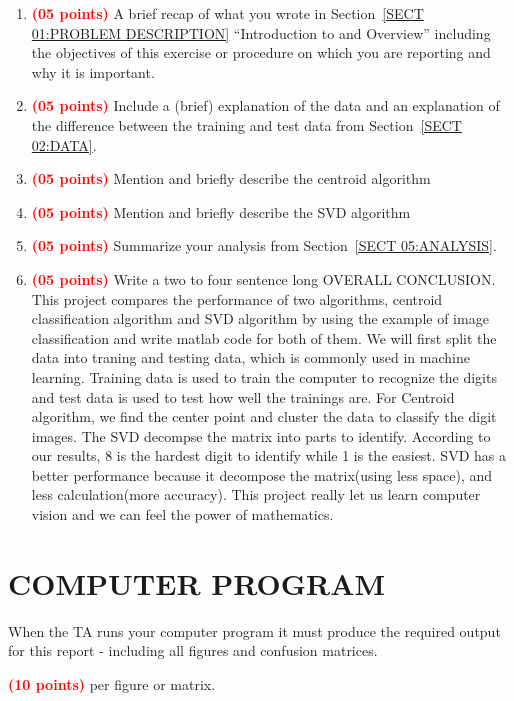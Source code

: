 \documentclass[dvipsnames,12pt]{article} %
\newcommand{\Brd}[1]{{\textbf{\textcolor{Red}{#1}}}}               %
\begin{document}
      \begin{enumerate}

        \item \Brd{(05 points)} A brief recap of what you wrote
          in Section~\ref{SECT 01:PROBLEM DESCRIPTION} ``Introduction to and Overview'' including
          the objectives of this exercise or procedure on which you are reporting and why it is
          important.

        \item \Brd{(05 points)} Include a (brief) explanation of the data  and an explanation of
          the difference between the training and test data from Section~\ref{SECT 02:DATA}.

        \item \Brd{(05 points)} Mention and briefly describe the centroid algorithm

        \item \Brd{(05 points)} Mention and briefly describe the SVD algorithm

        \item \Brd{(05 points)} Summarize your analysis from Section~\ref{SECT 05:ANALYSIS}.

        \item \Brd{(05 points)} Write a two to four sentence long OVERALL CONCLUSION.
This project compares the performance of two algorithms, centroid classification algorithm and SVD algorithm by using the example of image classification and write matlab code for both of them. We will first split the data into traning and testing data, which is commonly used in machine learning. Training data is used to train the computer to recognize the digits and test data is used to test how well the trainings are. For Centroid algorithm, we find the center point and cluster the data to classify the digit images. The SVD decompse the matrix into parts to identify. According to our results, 8 is the hardest digit to identify while 1 is the easiest. SVD has a better performance because it decompose the matrix(using less space), and less calculation(more accuracy). This project really let us learn computer vision and we can feel the power of mathematics. 
      \end{enumerate}

  \section{COMPUTER PROGRAM}
    \label{SECT 07:COMPUTER PROGRAM}

      \vspace{06pt}

       When the TA runs your computer program it must produce the required output for this report -
       including all figures and confusion matrices.

      \vspace{06pt}

     \Brd{(10 points)} per figure or matrix.
     
    
\end{document}
